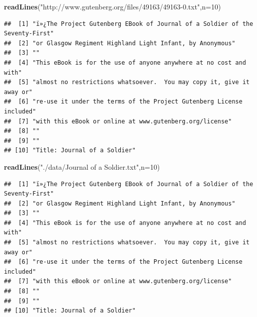\documentclass[]{book}
\newenvironment{Shaded}{\begin{snugshade}}{\end{snugshade}}
\newcommand{\KeywordTok}[1]{\textcolor[rgb]{0.13,0.29,0.53}{\textbf{#1}}}
\newcommand{\DataTypeTok}[1]{\textcolor[rgb]{0.13,0.29,0.53}{#1}}
\newcommand{\DecValTok}[1]{\textcolor[rgb]{0.00,0.00,0.81}{#1}}
\newcommand{\StringTok}[1]{\textcolor[rgb]{0.31,0.60,0.02}{#1}}
\newcommand{\NormalTok}[1]{#1}
\theoremstyle{definition}
\theoremstyle{definition}
\theoremstyle{definition}
\theoremstyle{remark}
\begin{document}
\begin{Shaded}
\begin{Highlighting}[]
\KeywordTok{readLines}\NormalTok{(}\StringTok{"http://www.gutenberg.org/files/49163/49163-0.txt"}\NormalTok{,}\DataTypeTok{n=}\DecValTok{10}\NormalTok{)}
\end{Highlighting}
\end{Shaded}

\begin{verbatim}
##  [1] "ï»¿The Project Gutenberg EBook of Journal of a Soldier of the Seventy-First"
##  [2] "or Glasgow Regiment Highland Light Infant, by Anonymous"                    
##  [3] ""                                                                           
##  [4] "This eBook is for the use of anyone anywhere at no cost and with"           
##  [5] "almost no restrictions whatsoever.  You may copy it, give it away or"       
##  [6] "re-use it under the terms of the Project Gutenberg License included"        
##  [7] "with this eBook or online at www.gutenberg.org/license"                     
##  [8] ""                                                                           
##  [9] ""                                                                           
## [10] "Title: Journal of a Soldier"
\end{verbatim}

\begin{Shaded}
\begin{Highlighting}[]
\KeywordTok{readLines}\NormalTok{(}\StringTok{"./data/Journal of a Soldier.txt"}\NormalTok{,}\DataTypeTok{n=}\DecValTok{10}\NormalTok{)}
\end{Highlighting}
\end{Shaded}

\begin{verbatim}
##  [1] "ï»¿The Project Gutenberg EBook of Journal of a Soldier of the Seventy-First"
##  [2] "or Glasgow Regiment Highland Light Infant, by Anonymous"                    
##  [3] ""                                                                           
##  [4] "This eBook is for the use of anyone anywhere at no cost and with"           
##  [5] "almost no restrictions whatsoever.  You may copy it, give it away or"       
##  [6] "re-use it under the terms of the Project Gutenberg License included"        
##  [7] "with this eBook or online at www.gutenberg.org/license"                     
##  [8] ""                                                                           
##  [9] ""                                                                           
## [10] "Title: Journal of a Soldier"
\end{verbatim}
\end{document}
